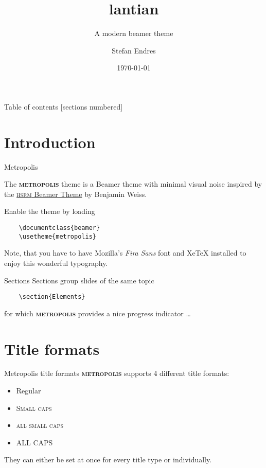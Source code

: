 \documentclass[10pt]{beamer}
\title{lantian}
\subtitle{A modern beamer theme}
\date{\today}
\author{Stefan Endres}
\institute{Center for modern beamer themes}
\newcommand{\themename}{\textbf{\textsc{metropolis}}\xspace}
\begin{document}
\maketitle

\begin{frame}{Table of contents}
  [sections numbered]
  \tableofcontents[hideallsubsections]
\end{frame}

\section{Introduction}

\begin{frame}[fragile]{Metropolis}

  The \themename theme is a Beamer theme with minimal visual noise
  inspired by the \href{https://github.com/hsrmbeamertheme/hsrmbeamertheme}{\textsc{hsrm} Beamer
  Theme} by Benjamin Weiss.

  Enable the theme by loading

  \begin{verbatim}    \documentclass{beamer}
    \usetheme{metropolis}\end{verbatim}

  Note, that you have to have Mozilla's \emph{Fira Sans} font and XeTeX
  installed to enjoy this wonderful typography.
\end{frame}
\begin{frame}[fragile]{Sections}
  Sections group slides of the same topic

  \begin{verbatim}    \section{Elements}\end{verbatim}

  for which \themename provides a nice progress indicator \ldots
\end{frame}

\section{Title formats}

\begin{frame}{Metropolis title formats}
	\themename supports 4 different title formats:
	\begin{itemize}
		\item Regular
		\item \textsc{Small caps}
		\item \textsc{all small caps}
		\item ALL CAPS
	\end{itemize}
	They can either be set at once for every title type or individually.
\end{frame}
\end{document}
